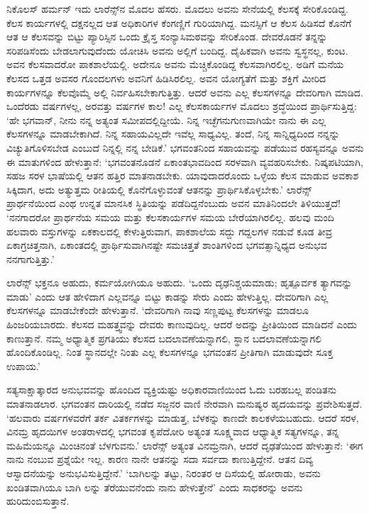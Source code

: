 ನಿಕೊಲಸ್ ಹರ್ಮನ್ ಇದು ಲಾರೆನ್ಸ್​ನ ಮೊದಲ ಹೆಸರು. ಮೊದಲು ಅವನು ಸೇನೆಯಲ್ಲಿ ಕೆಲಸಕ್ಕೆ ಸೇರಿಕೊಂಡಿದ್ದ. ಕೆಲಸ ಕಾರ್ಯಗಳಲ್ಲಿ ದಕ್ಷನಲ್ಲದ ಆತ ಅಧಿಕಾರಿಗಳ ಕೆಂಗಣ್ಣಿಗೆ ಗುರಿಯಾಗಿದ್ದ. ಮನಸ್ಸಿಗೆ ಆ ಕೆಲಸ ಹಿಡಿಸದೆ ಕೊನೆಗೆ ಆತ ಆ ಕೆಲಸವನ್ನು ಬಿಟ್ಟು ಪ್ಯಾರಿಸ್ಸಿನ ಒಂದು ಕ್ರೈಸ್ತ ಸಂನ್ಯಾಸಿಮಠವನ್ನು ಸೇರಿಕೊಂಡ. ದೇವರೊಡನೆ ತನ್ನನ್ನು ಸರಿಪಡಿಸೆಂದು ಬೇಡ\-ಲಾಗುವು\-ದೆಂದು ಯೋಚಿಸಿ ಅವನು ಅಲ್ಲಿಗೆ ಬಂದಿದ್ದ. ದೈಹಿಕವಾಗಿ ಅವನು ಸ್ವಸ್ಥನಲ್ಲ, ಕುಂಟ. ಅವನ ಕೆಲಸವಾದರೋ ಪಾಕಶಾಲೆಯಲ್ಲಿ. ಅದೇನೂ ಅವನು ಮೆಚ್ಚಿಕೊಂಡಿದ್ದ ಕೆಲಸವಾಗಿರಲಿಲ್ಲ. ಅಡಿಗೆ ಮನೆಯ ಕೆಲಸದ ಒತ್ತಡ ಅವಸರ ಗೊಂದಲಗಳು ಅವನಿಗೆ ಹಿಡಿಸಿರಲಿಲ್ಲ. ಅವನ ಯೋಗ್ಯತೆಗೆ ಮತ್ತು ಶಕ್ತಿಗೆ ಮೀರಿದ ಕಾರ್ಯಗಳನ್ನೂ ಕೆಲವೊಮ್ಮೆ ಅಲ್ಲಿ ನಿರ್ವಹಿಸಬೇಕಾಗುತ್ತಿತ್ತು. ಆದರೆ ಅವನು ಎಲ್ಲ ಕೆಲಸಗಳನ್ನೂ ದೇವರಿಗಾಗಿ ಮಾಡಿದ. ಒಂದೆರಡು ವರ್ಷಗಳಲ್ಲ, ಅರವತ್ತು ವರ್ಷಗಳ ಕಾಲ! ಎಲ್ಲ ಕೆಲಸಕಾರ್ಯಗಳ ಮೊದಲು ಶ್ರದ್ಧೆಯಿಂದ ಪ್ರಾರ್ಥಿಸುತ್ತಿದ್ದ: ‘ಹೇ ಭಗವಾನ್, ನೀನು ನನ್ನ ಅತ್ಯಂತ ಸಮೀಪದಲ್ಲಿದ್ದೀಯೆ. ನಿನ್ನ ಇಚ್ಛೆಗನುಗುಣವಾಗಿಯೇ ನಾನು ಈ ಎಲ್ಲ ಕೆಲಸಗಳನ್ನೂ ಮಾಡಬೇಕಾಗಿದೆ. ನಿನ್ನ ಸಹಾಯವಿಲ್ಲದೇ ಇವೆಲ್ಲ ಸಾಧ್ಯವಿಲ್ಲ. ತಂದೆ, ನಿನ್ನ ಸಾನ್ನಿಧ್ಯದಿಂದ ನನ್ನನ್ನು ವಿಚ್ಯುತಿಗೊಳಿಸಬೇಡ ಎಂಬುದೆ ನಿನ್ನಲ್ಲಿ ನನ್ನ ಬೇಡಿಕೆ.’ ಭಗವಂತನಿಂದ ಸಹಾಯವನ್ನು ಪಡೆಯುವ ರಹಸ್ಯವನ್ನೂ ಅವನು ಈ ಮಾತುಗಳಿಂದ ಹೇಳುತ್ತಾನೆ: ‘ಭಗವಂತನೊಡನೆ ಏಕಾಂತಭಾವದಿಂದ ಸರಳವಾಗಿ ವ್ಯವಹರಿಸಬೇಕು. ನಿಷ್ಕಪಟಿಯಾಗಿ, ಸಹಜ ಸರಳ ಭಾಷೆಯಲ್ಲಿ ಆತನ ಹತ್ತಿರ ಮಾತನಾಡಬೇಕು. ಯಾವುದಾದರೊಂದು ಒಳ್ಳೆಯ ಕೆಲಸ ಮಾಡುವ ಅವಕಾಶ ಸಿಕ್ಕಿದಾಗ, ಅದು ಅತ್ಯುತ್ತಮ ರೀತಿಯಲ್ಲಿ ಕೊನೆಗೊಳ್ಳುವಂತೆ ಆತನನ್ನು ಪ್ರಾರ್ಥಿಸಿಕೊಳ್ಳಬೇಕು.’ ಲಾರೆನ್ಸ್ ಪ್ರಾರ್ಥನೆಯಿಂದ ಎಂಥ ಉನ್ನತ ಮಾನಸಿಕ ಸ್ಥಿತಿಯನ್ನು ಪಡೆದಿದ್ದನೆಂಬುದು ಅವನ ಮಾತಿನಿಂದಲೇ ತಿಳಿಯುತ್ತದೆ! ‘ನನಗಾದರೋ ಪ್ರಾರ್ಥನೆಯ ಸಮಯ ಮತ್ತು ಕೆಲಸಕಾರ್ಯಗಳ ಸಮಯ ಬೇರೆಯಾಗಿರಲಿಲ್ಲ. ಹಲವು ಮಂದಿ ಹಲವಾರು ವಸ್ತುಗಳನ್ನು ಏಕಕಾಲದಲ್ಲಿ ಕೇಳುತ್ತಿರುವಾಗ, ಪಾಕಶಾಲೆಯ ಸದ್ದು ಗದ್ದಲಗಳ ನಡುವೆ ಕೂಡ ತೀವ್ರ ಏಕಾಗ್ರಚಿತ್ತನಾಗಿ, ಏಕಾಂತದಲ್ಲಿ ಪ್ರಾರ್ಥಿಸುವಾಗಿನಷ್ಟೇ ಸಮಚಿತ್ತತೆ ಶಾಂತಿಗಳಿಂದ ಭಗವತ್ಸಾನ್ನಿಧ್ಯದ ಅನುಭವ ನನಗಾಗುತ್ತಿತ್ತು.’

ಲಾರೆನ್ಸ್ ಭಕ್ತನೂ ಅಹುದು, ಕರ್ಮಯೋಗಿಯೂ ಅಹುದು. ‘ಒಂದು ದೃಢನಿಶ್ಚಯಮಾಡು; ಹೃತ್ಪೂರ್ವಕ ತ್ಯಾಗವನ್ನು ಮಾಡು’ ಎಂದು ಆತ ಹೇಳಿದಾಗ ಎಲ್ಲವನ್ನೂ ಬಿಟ್ಟು ಕಾಡನ್ನು ಸೇರು ಎಂದು ಹೇಳುತ್ತಿಲ್ಲ. ದೇವರಿಗಾಗಿ ಎಲ್ಲ ಕೆಲಸಗಳನ್ನೂ ಮಾಡಬೇಕೆಂದೇ ಹೇಳುತ್ತಾನೆ. ‘ದೇವರಿಗಾಗಿ ನಾವು ಸಣ್ಣಪುಟ್ಟ ಕೆಲಸಗಳನ್ನು ಮಾಡಲೂ ಹಿಂಜರಿಯಬಾರದು. ಕೆಲಸದ ಮಹತ್ತ್ವವನ್ನು ದೇವರು ಕಾಣುವುದಿಲ್ಲ. ಆದರೆ ಅದನ್ನು ಪ್ರೀತಿಯಿಂದ ಮಾಡಿದನೆ ಎಂದು ಕಾಣುತ್ತಾನೆ. ನಮ್ಮ ಅಧ್ಯಾತ್ಮಿಕ ಪ್ರಗತಿಯು ಕೆಲಸದ ಬದಲಾವಣೆಯನ್ನಾಗಲಿ, ಸ್ಥಾನ ಬದಲಾವಣೆಯನ್ನಾಗಲಿ ಹೊಂದಿಕೊಂಡಿಲ್ಲ. ನಿಂತ ಸ್ಥಾನದಲ್ಲೇ ನಿಂತು ಎಲ್ಲ ಕೆಲಸಗಳನ್ನೂ ಭಗವಂತನ ಪ್ರೀತಿಗಾಗಿ ಮಾಡುವುದೇ ಸೂಕ್ತ ಉಪಾಯ.’

ಸತ್ಯಸಾಕ್ಷಾತ್ಕಾರದ ಅನುಭವವನ್ನು ಹೊಂದಿದ ವ್ಯಕ್ತಿಯಷ್ಟು ಅಧಿಕಾರವಾಣಿಯಿಂದ ಓದು ಬರಹಬಲ್ಲ ಪಂಡಿತನು ಮಾತನಾಡಲಾರ. ಭಗವಂತನ ದಾರಿಯಲ್ಲಿ ನಡೆದ ಸಜ್ಜನರ ವಾಣಿ ನೇರವಾಗಿ ಮನುಷ್ಯರ ಹೃದಯವನ್ನು ಪ್ರವೇಶಿಸುತ್ತದೆ. ‘ಹಲವಾರು ವರ್ಷಗಳವರೆಗೆ ತರ್ಕ ವಿತರ್ಕಗಳನ್ನು ಮಾಡುತ್ತ, ಬೆಳಕನ್ನು ಕಾಣದೇ ಕಾಲಕಳೆಯಬಹುದು. ಆದರೆ ಸರಳ, ವಿನಮ್ರ ಹೃದಯಿಗಳ ಅಂತರಾಳದಲ್ಲಿ ಭಗವಂತ ಕೃಪೆದೋರಿ ಅತ್ಯಂತ ಸೂಕ್ಷ್ಮವಾದ ಆಧ್ಯಾತ್ಮಿಕ ಸತ್ಯಗಳನ್ನೂ, ತನ್ನ ಮಹಿಮೆಯನ್ನೂ ಮಿಂಚಿನಂತೆ ಬೆಳಗುವನು.’ ಲಾರೆನ್ಸ್ ಅತ್ಯಂತ ವಿನಮ್ರನಾಗಿ, ಆದರೆ ದೃಢತೆಯಿಂದ ಹೇಳುತ್ತಾನೆ: ‘ಈಗ ನಾನು ನಂಬುವ ಪ್ರಶ್ನೆಯೇ ಇಲ್ಲ. ಕಾರಣ ನಾನೇ ಆತನನ್ನು ಸದಾ ಸರ್ವದಾ ಕಾಣುತ್ತಿದ್ದೇನೆ. ಆತನ ದಿವ್ಯ ಆಸ್ವಾದನೆಯನ್ನು ಅನುಭವಿಸುತ್ತಿದ್ದೇನೆ.’ ‘ಬಾಗಿಲನ್ನು ತಟ್ಟು, ನಿರಂತರ ಆ ದಿಸೆಯಲ್ಲಿ ಹೋರಾಡು, ಅವನು ಖಂಡಿತವಾಗಿಯೂ ಬಾಗಿ ಲನ್ನು ತೆರೆಯುವನೆಂದು ನಾನು ಹೇಳುತ್ತೇನೆ’ ಎಂದು ಸಾಧಕರನ್ನು ಅವನು ಹುರಿದುಂಬಿಸುತ್ತಾನೆ.

